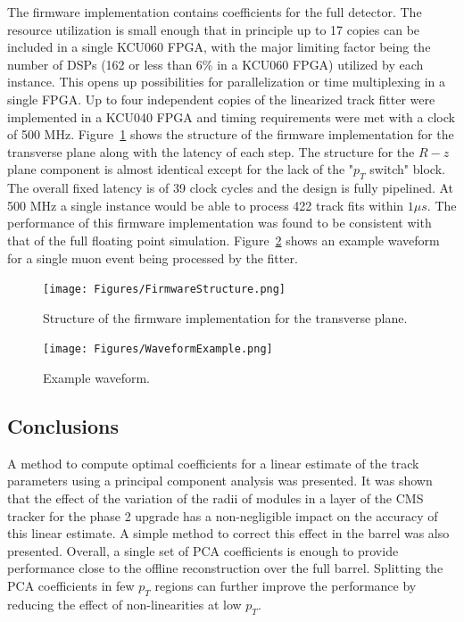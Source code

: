 \documentclass[10pt,a4paper]{report}
\begin{document}
The firmware implementation contains coefficients for the full detector. The resource utilization is small enough that in principle up to 17 copies can be included in a single KCU060 FPGA, with the major limiting factor being the number of DSPs (162 or less than 6\% in a KCU060 FPGA) utilized by each instance. This opens up possibilities for parallelization or time multiplexing in a single FPGA. Up to four independent copies of the linearized track fitter were implemented in a KCU040 FPGA and timing requirements were met with a clock of 500 MHz. Figure~\ref{fig:firmwareStructure} shows the structure of the firmware implementation for the transverse plane along with the latency of each step. The structure for the $R-z$ plane component is almost identical except for the lack of the "$p_T$ switch" block. The overall fixed latency is of 39 clock cycles and the design is fully pipelined. At 500 MHz a single instance would be able to process 422 track fits within $1 \mu s$. The performance of this firmware implementation was found to be consistent with that of the full floating point simulation. Figure~\ref{fig:waveformExample} shows an example waveform for a single muon event being processed by the fitter.

\begin{figure}
\begin{center}
\texttt{[image: Figures/FirmwareStructure.png]}
\caption{Structure of the firmware implementation for the transverse plane.}
\label{fig:firmwareStructure}
\end{center}
\end{figure}

\begin{figure}
\begin{center}
\texttt{[image: Figures/WaveformExample.png]}
\caption{Example waveform.}
\label{fig:waveformExample}
\end{center}
\end{figure}

\subsection{Conclusions}

A method to compute optimal coefficients for a linear estimate of the track parameters using a principal component analysis was presented. It was shown that the effect of the variation of the radii of modules in a layer of the CMS tracker for the phase 2 upgrade has a non-negligible impact on the accuracy of this linear estimate. A simple method to correct this effect in the barrel was also presented. Overall, a single set of PCA coefficients is enough to provide performance close to the offline reconstruction over the full barrel. Splitting the PCA coefficients in few $p_T$ regions can further improve the performance by reducing the effect of non-linearities at low $p_T$.
\end{document}
